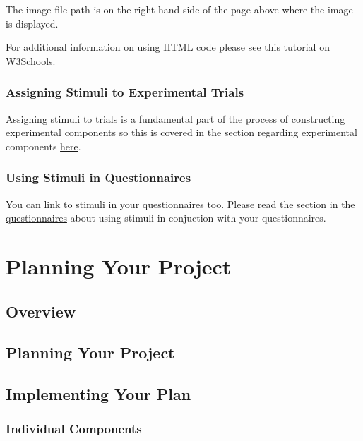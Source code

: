 \documentclass[]{book}
\begin{document}
The image file path is on the right hand side of the page above where
the image is displayed.

For additional information on using HTML code please see this tutorial
on \href{https://www.w3schools.com/html/}{W3Schools}.

\subsection{Assigning Stimuli to Experimental
Trials}\label{assigning-stimuli-to-experimental-trials}

Assigning stimuli to trials is a fundamental part of the process of
constructing experimental components so this is covered in the section
regarding experimental components
\protect\hyperlink{assignstimexp}{here}.

\subsection{Using Stimuli in
Questionnaires}\label{using-stimuli-in-questionnaires}

You can link to stimuli in your questionnaires too. Please read the
section in the \protect\hyperlink{assignstimquest}{questionnaires} about
using stimuli in conjuction with your questionnaires.

\chapter{Planning Your Project}\label{planning-your-project}

\section{Overview}\label{overview-2}

\section{Planning Your Project}\label{planning-your-project-1}

\section{Implementing Your Plan}\label{implementing-your-plan}

\subsection{Individual Components}\label{individual-components}
\end{document}

